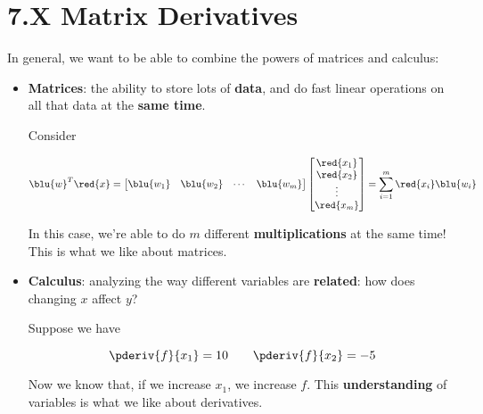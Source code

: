 
\section*{7.X  Matrix Derivatives}
    \label{mderiv}
        
    In general, we want to be able to combine the powers of matrices and calculus:
    
    \begin{itemize}
        \item \textbf{Matrices}: the ability to store lots of \textbf{data}, and do fast linear operations on all that data at the \textbf{same time}.
        
        \miniex Consider
        
        \begin{equation}
            \blu{w}^T\red{x} =
            \begin{bmatrix}
                \blu{w_1} & \blu{w_2} & \cdots & \blu{w_m}
            \end{bmatrix}
            \begin{bmatrix}
                \red{x_1} \\ \red{x_2} \\ \vdots \\ \red{x_m}
            \end{bmatrix}
            =
            \sum_{i=1}^m \red{x_i}\blu{w_i}
        \end{equation}
        
        In this case, we're able to do $m$ different \textbf{multiplications} at the same time! This is what we like about matrices.
        
        \item \textbf{Calculus}: analyzing the way different variables are \textbf{related}: how does changing $x$ affect $y$?
        
        \miniex Suppose we have 
        
        \begin{equation}
            \pderiv{f}{x_1}=10 \qquad 
            \pderiv{f}{x_2}=-5
        \end{equation}
        
        Now we know that, if we increase $x_1$, we increase $f$. This \textbf{understanding} of variables is what we like about derivatives.\\
    \end{itemize}
    
